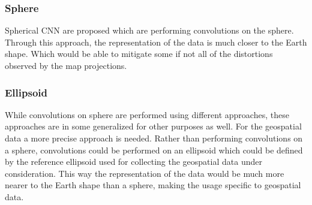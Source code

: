 \subsubsection*{Sphere}
Spherical CNN \cite{cohen2018spherical} are proposed which are performing convolutions on the sphere. Through this approach,
the representation of the data is much closer to the Earth shape.
Which would be able to mitigate some if not all of the distortions observed by the map projections.


\subsubsection*{Ellipsoid}
While convolutions on sphere are performed using different approaches, these approaches are in some generalized for other purposes as well. For the geospatial data a more precise approach is needed.
Rather than performing convolutions on a sphere, convolutions could be performed on an ellipsoid which could be defined by the reference ellipsoid used for collecting the geospatial data under consideration.
This way the representation of the data would be much more nearer to the Earth shape than a sphere, making the usage specific to geospatial data.

